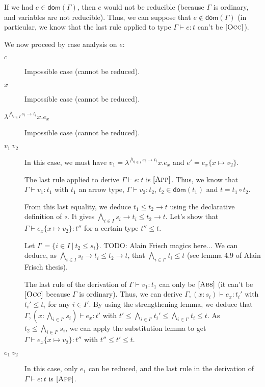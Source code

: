 \documentclass[a4paper]{article}%
\newcommand{\apply}[2]{#1\circ#2}
\newcommand{\dom}[1]{\textsf{dom}(#1)}
\newcommand{\alt}{~|~}
\newcommand{\subst}[2]{\{#1 \mapsto #2\}}
\theoremstyle{definition}
\newcommand {\Rule}[1] {[\textsc{#1}]}
\begin{document}
    If we had $e\in\dom\Gamma$, then $e$ would not be reducible (because $\Gamma$ is ordinary, and variables are not reducible).
    Thus, we can suppose that $e\not\in\dom\Gamma$ (in particular, we know that the last rule applied to type $\Gamma \vdash e:t$ can't be $\Rule{Occ}$).

    We now proceed by case analysis on $e$:

    \begin{description}
      \item[$c$] Impossible case (cannot be reduced).
      \item[$x$] Impossible case (cannot be reduced).
      \item[$\lambda^{\bigwedge_{i\in I} s_i \rightarrow t_i}x.e_x$] Impossible case (cannot be reduced).
      \item[$v_1\ v_2$] In this case, we must have $v_1=\lambda^{\bigwedge_{i\in I} s_i \rightarrow t_i}x.e_x$ and $e'=e_x\subst x {v_2}$.

      The last rule applied to derive $\Gamma \vdash e:t$ is $\Rule{App}$.
      Thus, we know that $\Gamma \vdash v_1 : t_1$ with $t_1$ an arrow type, $\Gamma \vdash v_2 : t_2$, $t_2 \in \dom {t_1}$ and $t=\apply {t_1} {t_2}$.

      From this last equality, we deduce $t_1 \leq t_2 \rightarrow t$ using the declarative definition of $\circ$.
      It gives $\bigwedge_{i\in I} s_i \rightarrow t_i \leq t_2 \rightarrow t$.
      Let's show that $\Gamma \vdash e_x\subst x {v_2}:t''$ for a certain type $t''\leq t$.

      Let $I'=\{i\in I\alt t_2 \leq s_i\}$. TODO: Alain Frisch magics here...
      We can deduce, as $\bigwedge_{i\in I} s_i \rightarrow t_i \leq t_2 \rightarrow t$,
      that $\bigwedge_{i\in I'} t_i \leq t$ (see lemma 4.9 of Alain Frisch thesis).

      The last rule of the derivation of $\Gamma \vdash v_1 : t_1$ can only be $\Rule{Abs}$ (it can't be $\Rule{Occ}$ because $\Gamma$ is ordinary).
      Thus, we can derive $\Gamma,(x:s_i) \vdash e_x : t_i'$ with $t_i' \leq t_i$ for any $i\in I'$. By using the strengthening lemma, we deduce that
      $\Gamma, (x:\bigwedge_{i\in I'} s_i) \vdash e_x:t'$ with $t'\leq \bigwedge_{i\in I'} t_i' \leq \bigwedge_{i\in I'} t_i \leq t$.
      As $t_2 \leq \bigwedge_{i\in I'} s_i$, we can apply the substitution lemma to get $\Gamma \vdash e_x\subst x {v_2}:t''$ with $t'' \leq t' \leq t$.

      \item[$e_1\ v_2$] In this case, only $e_1$ can be reduced, and the last rule in the derivation of $\Gamma \vdash e:t$ is $\Rule{App}$.


\end{description}
\end{document}
